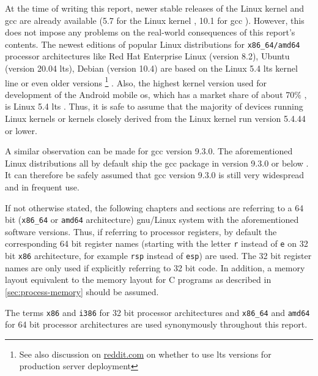 At the time of writing this report, newer stable releases of the Linux kernel and \gls{gcc} are already available (5.7 for the Linux kernel \cite{LKO2020a}, 10.1 for \gls{gcc} \cite{FSF2020}).
However, this does not impose any problems on the real-world consequences of this report's contents.
The newest editions of popular Linux distributions for \texttt{x86\_64/amd64} processor architectures like Red Hat Enterprise Linux (version 8.2), Ubuntu (version 20.04 \gls{lts}), Debian (version 10.4) are based on the Linux 5.4 \gls{lts} kernel line or even older versions%
\footnote{See also discussion on \href{https://www.reddit.com/r/webhosting/comments/beg0z0/should_i_use_an_lts_version_of_ubuntu_for_my_web/}{reddit.com} on whether to use \gls{lts} versions for production server deployment}
\cite{RedHat2020,Canonical2020,SPI2020,SPI2020a}.
Also, the highest kernel version used for development of the Android mobile \gls{os}, which has a market share of about 70\% \cite{Statcounter2020}, is Linux 5.4 \gls{lts} \cite{GoogleLLC2020}.
Thus, it is safe to assume that the majority of devices running Linux kernels or kernels closely derived from the Linux kernel run version 5.4.44 or lower.

A similar observation can be made for \gls{gcc} version 9.3.0.
The aforementioned Linux distributions all by default ship the \gls{gcc} package in version 9.3.0 or below \cite{RedHat2020a,Canonical2020a,SPI2020b}.
It can therefore be safely assumed that \gls{gcc} version 9.3.0 is still very widespread and in frequent use.

If not otherwise stated, the following chapters and sections are referring to a 64 bit (\texttt{x86\_64} or \texttt{amd64} architecture) \acs{gnu}/Linux system with the aforementioned software versions.
Thus, if referring to processor registers, by default the corresponding 64 bit register names (starting with the letter \texttt{r} instead of \texttt{e} on 32 bit \texttt{x86} architecture, for example \texttt{rsp} instead of \texttt{esp}) are used.
The 32 bit register names are only used if explicitly referring to 32 bit code.
In addition, a memory layout equivalent to the memory layout for C programs as described in \cref{sec:process-memory} should be assumed.

The terms \texttt{x86} and \texttt{i386} for 32 bit processor architectures and \texttt{x86\_64} and \texttt{amd64} for 64 bit processor architectures are used synonymously throughout this report.

